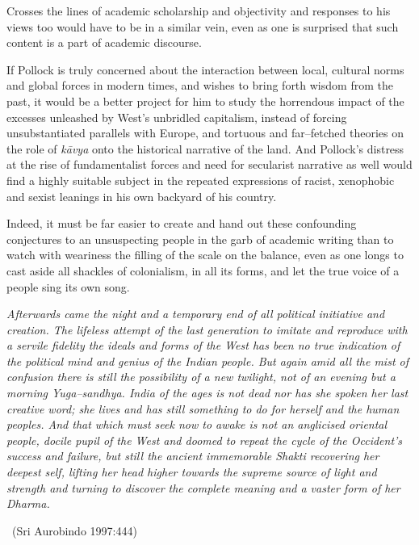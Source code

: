 Crosses the lines of academic scholarship and objectivity and responses to his views too would have to be in a similar vein, even as one is surprised that such content is a part of academic discourse.

If Pollock is truly concerned about the interaction between local, cultural norms and global forces in modern times, and wishes to bring forth wisdom from the past, it would be a better project for him to study the horrendous impact of the excesses unleashed by West’s unbridled capitalism, instead of forcing unsubstantiated parallels with Europe, and tortuous and far–fetched theories on the role of \textit{kāvya} onto the historical narrative of the land. And Pollock’s distress at the rise of fundamentalist forces and need for secularist narrative as well would find a highly suitable subject in the repeated expressions of racist, xenophobic and sexist leanings in his own backyard of his country.

Indeed, it must be far easier to create and hand out these confounding conjectures to an unsuspecting people in the garb of academic writing than to watch with weariness the filling of the scale on the balance, even as one longs to cast aside all shackles of colonialism, in all its forms, and let the true voice of a people sing its own song.

\begin{myquote}
\textit{Afterwards came the night and a temporary end of all political initiative and creation. The lifeless attempt of the last generation to imitate and reproduce with a servile fidelity the ideals and forms of the West has been no true indication of the political mind and genius of the Indian people. But again amid all the mist of confusion there is still the possibility of a new twilight, not of an evening but a morning Yuga–sandhya. India of the ages is not dead nor has she spoken her last creative word; she lives and has still something to do for herself and the human peoples. And that which must seek now to awake is not an anglicised oriental people, docile pupil of the West and doomed to repeat the cycle of the Occident’s success and failure, but still the ancient immemorable Shakti recovering her deepest self, lifting her head higher towards the supreme source of light and strength and turning to discover the complete meaning and a vaster form of her Dharma.} 

~\hfill (Sri Aurobindo 1997:444)
\end{myquote}



